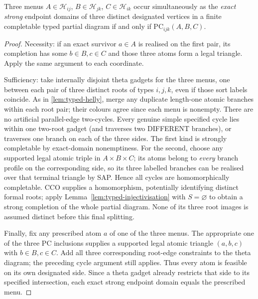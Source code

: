 \begin{lemma}\label{lem:typed-triple-occurrence}
Three menus $A\in\mathcal H_{ij}$, $B\in\mathcal H_{jk}$,
$C\in\mathcal H_{ik}$ occur simultaneously as the \emph{exact
strong} endpoint domains of three distinct designated vertices in
a finite completable typed partial diagram if and only if
$\mathrm{PC}_{ijk}(A,B,C)$.
\end{lemma}
\begin{proof}
Necessity: if an exact survivor $a\in A$ is realised on the first
pair, its completion has some $b\in B,c\in C$ and those three atoms
form a legal triangle.  Apply the same argument to each coordinate.

Sufficiency: take internally disjoint theta gadgets for the three
menus, one between each pair of three distinct roots of types
$i,j,k$, even if those sort labels coincide. As in
\cref{lem:typed-helly}, merge any duplicate length-one atomic
branches within each root pair; their colours agree since each
menu is nonempty. There are no artificial parallel-edge
two-cycles. Every genuine simple specified cycle lies within
one two-root gadget (and traverses two DIFFERENT branches),
or traverses one branch on each of the three sides.
The first kind is strongly completable by exact-domain
nonemptiness.  For the second, choose any supported legal atomic
triple in $A\times B\times C$; its atoms belong to \emph{every}
branch profile on the corresponding side, so its three labelled
branches can be realised over that terminal triangle by SAP.
Hence all cycles are homomorphically completable.  CCO supplies a
homomorphism, potentially identifying distinct formal roots; apply
Lemma~\ref{lem:typed-injectivisation} with $S=\varnothing$ to obtain
a strong completion of the whole partial diagram.  None of its three
root images is assumed distinct before this final splitting.

Finally, fix any prescribed atom $a$ of one of the three menus.
The appropriate one of the three PC inclusions supplies a supported
legal atomic triangle $(a,b,c)$ with $b\in B,c\in C$.
Add all three corresponding root-edge constraints to the theta
diagram; the preceding cycle argument still applies.  Thus every
atom is feasible on its own designated side.  Since a theta gadget
already restricts that side to its specified intersection, each
exact strong endpoint domain equals the prescribed menu.
\end{proof}
